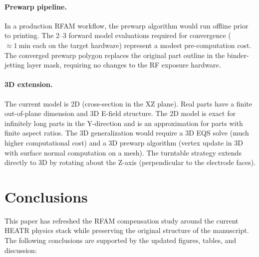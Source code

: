 \documentclass[5p,times]{elsarticle}
\begin{document}
\paragraph{Prewarp pipeline.}
In a production RFAM workflow, the prewarp algorithm would run
offline prior to printing.  The 2--3 forward model evaluations required
for convergence ($\approx\SI{1}{\minute}$ each on the target hardware)
represent a modest pre-computation cost.  The converged prewarp polygon
replaces the original part outline in the binder-jetting layer mask,
requiring no changes to the RF exposure hardware.

\paragraph{3D extension.}
The current model is 2D (cross-section in the XZ plane).  Real parts
have a finite out-of-plane dimension and 3D E-field structure.  The
2D model is exact for infinitely long parts in the Y-direction and is
an approximation for parts with finite aspect ratios.  The 3D
generalization would require a 3D EQS solve (much higher computational
cost) and a 3D prewarp algorithm (vertex update in 3D with surface
normal computation on a mesh).  The turntable strategy extends directly
to 3D by rotating about the Z-axis (perpendicular to the electrode
faces).

\FloatBarrier
\section{Conclusions}
\label{sec:conclusions}

This paper has refreshed the RFAM compensation study around the current
HEATR physics stack while preserving the original structure of the
manuscript.  The following conclusions are supported by the updated
figures, tables, and discussion:
\end{document}
